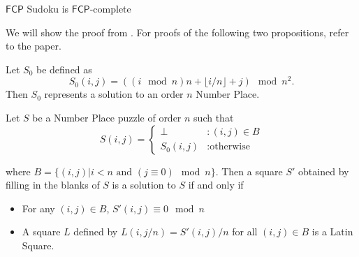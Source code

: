 \documentclass[runningheads,a4paper]{llncs}
\begin{document}
\begin{theorem}
$\mathsf{FCP}$ Sudoku is $\mathsf{FCP}$-complete
\end{theorem}

We will show the proof from \cite{takayuki2003complexity}. For proofs of the following two propositions, refer to the paper. 

\begin{proposition}
Let $S_0$ be defined as
$$S_0 (i,j) = ((i \mod n) n + \lfloor i/n \rfloor + j) \mod n^2. $$
Then $S_0$ represents a solution to an order $n$ Number Place. 
\end{proposition}

\begin{proposition}
Let $S$ be a Number Place puzzle of order $n$ such that
\begin{displaymath}
S(i,j) = \left\{
\begin{array}{lr}
\perp & : (i,j) \in B\\
S_0 (i,j) & : \text{otherwise}
\end{array}
\right.
\end{displaymath}

where $B = \{ (i,j) | i < n \text{ and } (j \equiv 0) \mod n \}$. Then a square $S'$ obtained by filling in the blanks of $S$ is a solution to $S$ if and only if

\begin{itemize}
\item For any $(i,j) \in B$, $S'(i,j) \equiv 0 \mod n$
\item A square $L$ defined by $L(i, j/n) = S'(i,j)/n$ for all $(i, j) \in B$ is a Latin Square.
\end{itemize}

\end{proposition}
\end{document}
